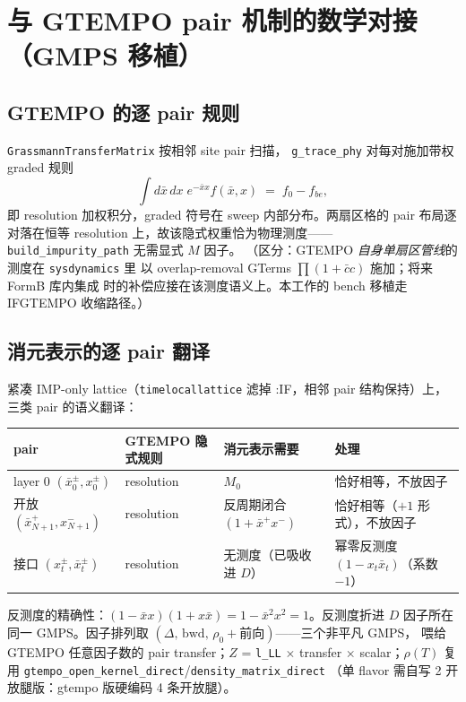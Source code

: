\documentclass[11pt,a4paper]{ctexart}
\newcommand{\xb}{\bar x}          %
\newcommand{\Deff}{D}             %
\begin{document}
\section{与 GTEMPO pair 机制的数学对接（GMPS 移植）}
\label{sec:pair}

\subsection{GTEMPO 的逐 pair 规则}

\texttt{GrassmannTransferMatrix} 按相邻 site pair 扫描，
\texttt{g\_trace\_phy} 对每对施加带权 graded 规则
\begin{equation}
\int d\bar x\,dx\;e^{-\bar xx}f(\bar x,x) \;=\; f_0-f_{be},
\end{equation}
即 resolution 加权积分，graded 符号在 sweep 内部分布。两扇区格的 pair
布局逐对落在恒等 resolution 上，故该隐式权重恰为物理测度——
\texttt{build\_impurity\_path} 无需显式 $M$ 因子。
（区分：GTEMPO \emph{自身单扇区管线}的测度在 \texttt{sysdynamics} 里
以 overlap-removal GTerms $\prod(1+\bar cc)$ 施加；将来 FormB 库内集成
时的补偿应接在该测度语义上。本工作的 bench 移植走 IFGTEMPO 收缩路径。）

\subsection{消元表示的逐 pair 翻译}

紧凑 IMP-only lattice（\texttt{timelocallattice} 滤掉 :IF，相邻 pair
结构保持）上，三类 pair 的语义翻译：

\begin{center}
\begin{tabular}{llll}
\toprule
pair & GTEMPO 隐式规则 & 消元表示需要 & 处理 \\
\midrule
layer 0 $(\xb_0^{\pm},x_0^{\pm})$ & resolution & $M_0$ & 恰好相等，不放因子 \\
开放 $(\xb_{N+1}^{+},x_{N+1}^{-})$ & resolution & 反周期闭合 $(1+\xb^{+}x^{-})$ & 恰好相等（$+1$ 形式），不放因子 \\
接口 $(x_t^{\pm},\xb_t^{\pm})$ & resolution & 无测度（已吸收进 $\Deff$） & 幂零反测度 $(1-x_t\xb_t)$（系数 $-1$） \\
\bottomrule
\end{tabular}
\end{center}

反测度的精确性：$(1-\bar xx)(1+x\bar x)=1-\bar x^2x^2=1$。反测度折进
$\Deff$ 因子所在同一 GMPS。因子排列取
$(\Delta,\,\mathrm{bwd},\,\rho_0{+}\text{前向})$——三个非平凡 GMPS，
喂给 GTEMPO 任意因子数的 pair transfer；$Z$ = \texttt{l\_LL} $\times$
transfer $\times$ scalar；$\rho(T)$ 复用
\texttt{gtempo\_open\_kernel\_direct}/\texttt{density\_matrix\_direct}
（单 flavor 需自写 2 开放腿版：gtempo 版硬编码 4 条开放腿）。
\end{document}

